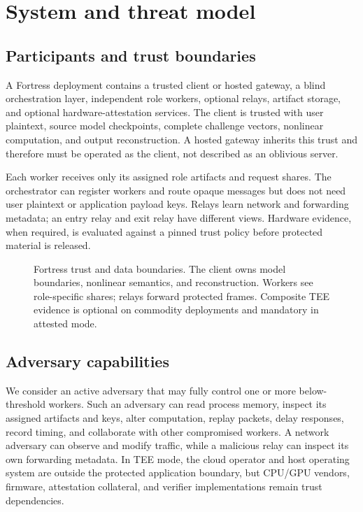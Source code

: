 \section{System and threat model}\label{sec:threat}

\subsection{Participants and trust boundaries}

A Fortress deployment contains a trusted client or hosted gateway, a blind orchestration layer, independent role workers, optional relays, artifact storage, and optional hardware-attestation services. The client is trusted with user plaintext, source model checkpoints, complete challenge vectors, nonlinear computation, and output reconstruction. A hosted gateway inherits this trust and therefore must be operated as the client, not described as an oblivious server.

Each worker receives only its assigned role artifacts and request shares. The orchestrator can register workers and route opaque messages but does not need user plaintext or application payload keys. Relays learn network and forwarding metadata; an entry relay and exit relay have different views. Hardware evidence, when required, is evaluated against a pinned trust policy before protected material is released.

\begin{figure}[htbp]
\centering

\caption{Fortress trust and data boundaries. The client owns model boundaries, nonlinear semantics, and reconstruction. Workers see role-specific shares; relays forward protected frames. Composite TEE evidence is optional on commodity deployments and mandatory in attested mode.}
\label{fig:architecture}
\end{figure}

\subsection{Adversary capabilities}

We consider an active adversary that may fully control one or more below-threshold workers. Such an adversary can read process memory, inspect its assigned artifacts and keys, alter computation, replay packets, delay responses, record timing, and collaborate with other compromised workers. A network adversary can observe and modify traffic, while a malicious relay can inspect its own forwarding metadata. In TEE mode, the cloud operator and host operating system are outside the protected application boundary, but CPU/GPU vendors, firmware, attestation collateral, and verifier implementations remain trust dependencies.


